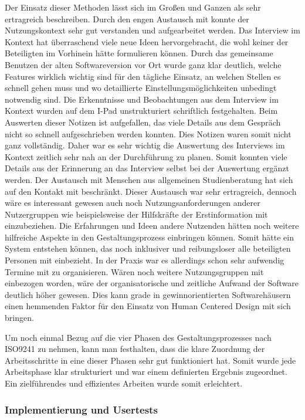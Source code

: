 Der Einsatz dieser Methoden lässt sich im Großen und Ganzen als sehr
ertragreich beschreiben. Durch den engen Austausch mit \ipName konnte der
Nutzungskontext sehr gut verstanden und aufgearbeitet werden. Das Interview im
Kontext hat überraschend viele neue Ideen hervorgebracht, die wohl keiner der
Beteiligten im Vorhinein hätte formulieren können. Durch das gemeinsame
Benutzen der alten Softwareversion vor Ort wurde ganz klar deutlich, welche
Features wirklich wichtig sind für den tägliche Einsatz, an welchen Stellen es
schnell gehen muss und wo detaillierte Einstellungsmöglichkeiten unbedingt
notwendig sind. Die Erkenntnisse und Beobachtungen aus dem Interview im Kontext
wurden auf dem I-Pad unstrukturiert schriftlich festgehalten. Beim Auswerten
dieser Notizen ist aufgefallen, das viele Details aus dem Gespräch nicht so
schnell aufgeschrieben werden konnten. Dies Notizen waren somit nicht ganz
vollständig. Daher war es sehr wichtig die Auswertung des Interviews im Kontext
zeitlich sehr nah an der Durchführung zu planen. Somit konnten viele Details
aus der Erinnerung an das Interview selbst bei der Auswertung ergänzt werden.
Der Austausch mit Menschen aus allgemeinen Studienberatung hat sich auf den
Kontakt mit \ipName beschränkt. Dieser Austausch war sehr ertragreich, dennoch
wäre es interessant gewesen auch noch Nutzungsanforderungen anderer
Nutzergruppen wie beispielsweise der Hilfskräfte der Erstinformation mit
einzubeziehen. Die Erfahrungen und Ideen andere Nutzenden hätten noch weitere
hilfreiche Aspekte in den Gestaltungsprozess einbringen können. Somit hätte ein
System entstehen können, das noch inklusiver und reibungsloser alle beteiligten
Personen mit einbezieht. In der Praxis war es allerdings schon sehr aufwendig
Termine mit \ipName zu organisieren. Wären noch weitere Nutzungsgruppen mit
einbezogen worden, wäre der organisatorische und zeitliche Aufwand der Software
deutlich höher gewesen. Dies kann grade in gewinnorientierten Softwarehäusern
einen hemmenden Faktor für den Einsatz von Human Centered Design mit sich
bringen.

Um noch einmal Bezug auf die vier Phasen des Gestaltungsprozesses nach ISO9241
zu nehmen, kann man festhalten, dass die klare Zuordnung der Arbeitsschritte in
eine dieser Phasen sehr gut funktioniert hat. Somit wurde jede Arbeitsphase
klar strukturiert und war einem definierten Ergebnis zugeordnet. Ein
zielführendes und effizientes Arbeiten wurde somit erleichtert.

\subsubsection{Implementierung und Usertests}


